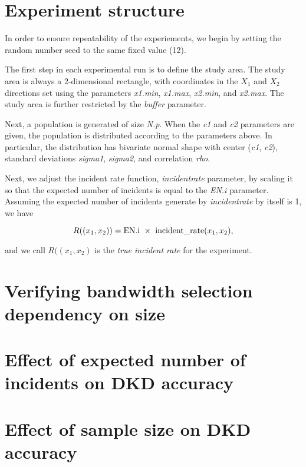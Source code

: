 \section{Experiment structure}
\label{sec:method:experiment_structure}

In order to ensure repeatability of the experiements, we begin by setting the random number seed to the same fixed value (12).

The first step in each experimental run is to define the study area. 
The study area is always a 2-dimensional rectangle, with coordinates in the \(X_1\) and \(X_2\) directions set using the parameters \textit{x1.min}, \textit{x1.max}, \textit{x2.min}, and \textit{x2.max}.
The study area is further restricted by the \textit{buffer} parameter.

Next, a population is generated of size \textit{N.p}.
When the \textit{c1} and \textit{c2} parameters are given, the population is distributed according to the parameters above.
In particular, the distribution has bivariate normal shape with center (\textit{c1}, \textit{c2}),
standard deviations \textit{sigma1}, \textit{sigma2}, and correlation \textit{rho}.

Next, we adjust the incident rate function, \textit{incident\textunderscore rate} parameter, by scaling it so that the expected number of incidents is equal to the \textit{EN.i} parameter.
Assuming the expected number of incidents generate by \textit{incident\textunderscore rate} by itself is 1, we have

\[
    R((x_1, x_2)) = \mbox{EN.i}~\times~\mbox{incident\textunderscore rate}(x_1, x_2) \text{,}
\]

and we call \(R((x_1, x_2)\) is the \textit{true incident rate} for the experiment.

\section{Verifying bandwidth selection dependency on size}

\section{Effect of expected number of incidents on DKD accuracy}

\section{Effect of sample size on DKD accuracy}

